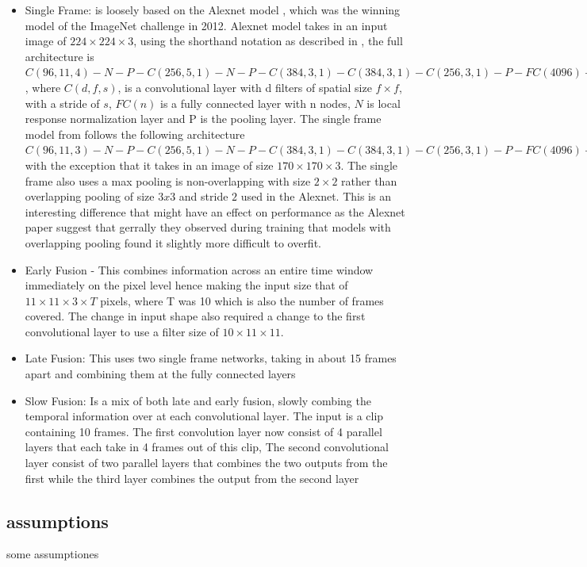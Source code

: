 \begin{itemize}
    \item Single Frame: is loosely based on the Alexnet model \cite{NIPS2012_4824}, which was the winning model of the ImageNet challenge in 2012. Alexnet model takes in an input image of $224 \times 224 \times 3$, using the shorthand notation as described in \citep{KarpathyCVPR14}, the full architecture is $C(96, 11, 4)-N-P-C(256, 5, 1)-N-P-C(384, 3, 1)-C(384, 3, 1)-C(256, 3, 1)-P-F C(4096)-F C(4096)$, where $C(d, f, s)$, is a convolutional layer with d filters of spatial size $ f × f$, with a stride of $s$,  $FC(n)$ is a fully connected layer with n nodes, $N$ is local response normalization layer and P is the pooling layer. The single frame model from \cite{KarpathyCVPR14} follows the following architecture  $C(96, 11, 3)-N-P-C(256, 5, 1)-N-P-C(384, 3, 1)-C(384, 3, 1)-C(256, 3, 1)-P-F C(4096)-FC(4096)$ with the exception that it takes in an image of size $ 170 \times 170 \times 3$. The single frame also uses a max pooling is non-overlapping with size $2 \times 2$ rather than overlapping pooling of size $3x3$ and stride $2$ used in the Alexnet. This is an interesting difference that might have an effect on performance as the Alexnet paper suggest that gerrally they observed during training that models with overlapping pooling found it slightly more difficult to overfit.
    \item Early Fusion - This combines information across an entire time window immediately on the pixel level hence making the input size that of $11 \times 11 \times 3 \times T$ pixels, where T was 10 which is also the number of frames covered. The change in input shape also required a change to the first convolutional layer to use a filter size of $10 \times 11 \times 11$.
    \item Late Fusion: This uses two single frame networks, taking in about 15 frames apart and combining them at the fully connected layers
    \item Slow Fusion: Is a mix of both late and early fusion, slowly combing the temporal information over at each convolutional layer. The input is a clip containing 10 frames. The first convolution layer now consist of 4 parallel layers that each take in 4 frames out of this clip, The second convolutional layer consist of two parallel layers that combines the two outputs from the first while the third layer combines the output from the second layer
\end{itemize}

\subsection{assumptions}
some assumptiones



